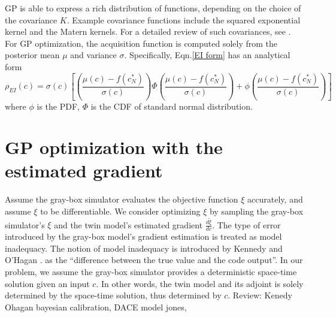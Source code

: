 \documentclass[a4paper,onecolumn]{article}
\theoremstyle{remark}
\begin{document}
\indent GP is able to express a rich distribution of functions, depending on the choice of the covariance $K$.
Example covariance functions include the squared exponential kernel and the Matern kernels. 
For a detailed review of such covariances, see \cite{practical Bayesian}.\\

\indent For GP optimization, the 
acquisition function is computed solely from the posterior mean $\mu$ and
variance $\sigma$. Specifically, Eqn.\eqref{EI form} has an analytical form
\begin{equation}
    \rho_{EI}(c) = \sigma(c) \left[ \left( \frac{\mu(c)-f(c_N^*)}{\sigma(c)} \right)
    \Phi\left( \frac{\mu(c)-f(c_N^*)}{\sigma(c)} \right) + 
    \phi\left(\frac{\mu(c)-f(c_N^*)}{\sigma(c)}\right) \right]
\end{equation}
where $\phi$ is the PDF, $\Phi$ is the CDF of standard normal distribution.
\\

\section{GP optimization with the estimated gradient}
\label{GPtwin}
\indent Assume the gray-box simulator evaluates the objective function $\xi$ accurately, and
assume $\xi$ to be differentiable. We consider 
optimizing $\xi$ by sampling the gray-box simulator's $\xi$ and the twin 
model's estimated gradient $\frac{d\tilde{\xi}}{d c}$. 
The type of error introduced by the gray-box model's gradient estimation is treated
as model inadequacy. The notion of model inadequacy is introduced by Kennedy and O'Hagan 
\cite{KennedyOhagan1}.
as the ``difference between the true value and the code output''. In our problem, we assume the 
gray-box simulator provides a deterministic space-time solution given an input $c$.
In other words, the twin model and its adjoint
is solely determined by the space-time solution, thus determined by $c$. 
Review: Kenedy Ohagan bayesian calibration,
DACE model jones,
\end{document}
